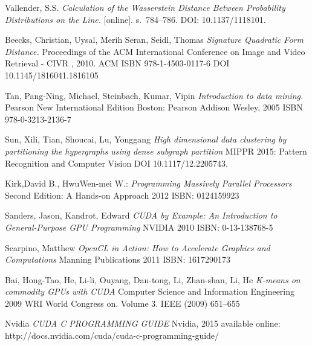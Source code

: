 \begin{thebibliography}{99}
{\sc Vallender,} S.S.
\emph{Calculation of the Wasserstein Distance Between Probability Distributions on the Line.}
[online]. s.~784--786. DOI: 10.1137/1118101.

{\sc Beecks,} Christian, {\sc Uysal,} Merih Seran, {\sc Seidl,} Thomas
\emph{Signature Quadratic Form Distance.}
Proceedings of the ACM International Conference on Image and Video Retrieval - CIVR , 2010.
ACM
ISBN 978-1-4503-0117-6
DOI 10.1145/1816041.1816105

{\sc Tan,} Pang-Ning, {\sc Michael,} Steinbach, {\sc Kumar,} Vipin
\emph{Introduction to data mining.}
Pearson New International Edition
Boston: Pearson Addison Wesley, 2005
ISBN 978-0-3213-2136-7

{\sc Sun,} Xili, {\sc Tian,} Shoucai, {\sc Lu,} Yonggang
\emph{High dimensional data clustering by partitioning the hypergraphs using dense subgraph partition}
MIPPR 2015: Pattern Recognition and Computer Vision
DOI 10.1117/12.2205743.

{\sc Kirk,}David B., {\sc Hwu}Wen-mei W.:
\emph{Programming Massively Parallel Processors}
Second Edition: A Hands-on Approach
2012
ISBN: 0124159923 

{\sc Sanders,} Jason, {\sc Kandrot,} Edward
\emph{CUDA by Example: An Introduction to General-Purpose GPU Programming}
NVIDIA
2010
ISBN: 0-13-138768-5 

{\sc Scarpino,} Matthew
\emph{OpenCL in Action: How to Accelerate Graphics and Computations}
Manning Publications
2011
ISBN: 1617290173 

{\sc Bai,} Hong-Tao, {\sc He,} Li-li, {\sc Ouyang,} Dan-tong, {\sc Li,} Zhan-shan, {\sc Li, } He
\emph{K-means on commodity GPUs with CUDA}
 Computer Science and Information Engineering
 2009
 WRI World Congress on. Volume 3.
 IEEE (2009) 651–655 

Nvidia
\emph{CUDA C PROGRAMMING GUIDE}
Nvidia, 2015
available online: http://docs.nvidia.com/cuda/cuda-c-programming-guide/
\end{thebibliography}